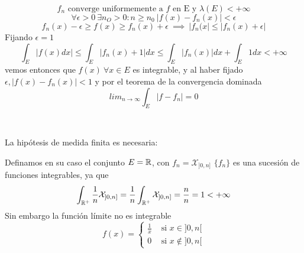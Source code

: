 
\[ f_n \mbox{ converge uniformemente a } f \mbox{ en E y } \lambda (E) < +\infty
\]
\[ \forall \epsilon > 0 \ \exists n_O > 0: n\geq n_0 \ |f(x)-f_n(x)| < \epsilon
\]
\[ f_n(x) - \epsilon \geq f(x) \geq f_n(x) + \epsilon \ \implies \ 
  | f_n(x | \leq | f_n(x) + \epsilon |
\]
Fijando $\epsilon = 1$
\[ \int_E |f(x)dx| \leq \int_E |f_n(x)+1|dx \leq 
   \int_E |f_n(x)|dx + \int_E1dx < +\infty
\]
vemos entonces que $f(x) \ \forall x\in E$ es integrable, y al haber fijado 
$\epsilon , |f(x)-f_n(x)| < 1$ y por el teorema de la convergencia dominada
\[ lim_{n \rightarrow \infty} \int_E |f-f_n| = 0
\]  

{\ }

La hipótesis de medida finita es necesaria:

Definamos en su caso el conjunto $E=\mathbb{R}$, con $f_n = \mathcal{X}_{]0,n]}$ 
$\{f_n\}$ es una sucesión de funciones integrables, ya que
\[ \int_{\mathbb{R}^+} \frac{1}{n} \mathcal{X}_{]0, n]} = 
   \frac{1}{n} \int_{\mathbb{R}^+} \mathcal{X}_{]0, n]} = \frac{n}{n} = 1 < +\infty
\] 
Sin embargo la función límite no es integrable
\[ f(x) = \left\{
		  \begin{matrix} 
    		      \frac{1}{x} & \mbox{ si }x\in ]0,n[
	          \\ 0        & \mbox{ si } x\not\in ]0, n[      	  
		  \end{matrix} 
		  \right. 
\]

